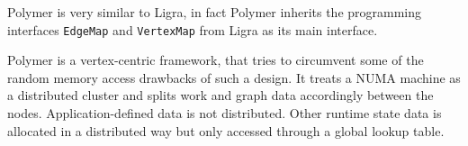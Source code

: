 
Polymer is very similar to Ligra, in fact Polymer inherits the programming interfaces \texttt{EdgeMap} and \texttt{VertexMap} from Ligra as its main interface.

Polymer is a vertex-centric framework, that tries to circumvent some of the random memory access drawbacks of such a design. It treats a NUMA machine as a distributed cluster and splits work and graph data accordingly between the nodes.\cite[p.187]{Polymer}
Application-defined data is not distributed. Other runtime state data is allocated in a distributed way but only accessed through a global lookup table.\cite[p.184]{Polymer}



